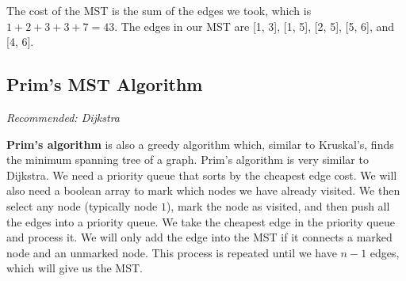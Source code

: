 \documentclass{article}
\begin{document}
\begin{center}
 \end{center}

The cost of the MST is the sum of the edges we took, which is $1 + 2 + 3 + 3 + 7 = 43$. The edges in our MST are [1, 3], [1, 5], [2, 5], [5, 6], and [4, 6].

 
\subsection{Prim's MST Algorithm}
\textit{Recommended: Dijkstra}

\textbf{Prim's algorithm} is also a greedy algorithm which, similar to Kruskal's, finds the minimum spanning tree of a graph.
Prim's algorithm is very similar to Dijkstra. We need a priority queue that sorts by the cheapest edge cost. We will also need a boolean array to mark which nodes we have already visited. We then select any node (typically node $1$), mark the node as visited, and then push all the edges into a priority queue. We take the cheapest edge in the priority queue and process it. We will only add the edge into the MST if it connects a marked node and an unmarked node. This process is repeated until we have $n - 1$ edges, which will give us the MST.
\end{document}
